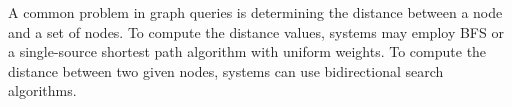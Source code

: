 
A common problem in graph queries is determining the distance between a node and
a set of nodes. To compute the distance values, systems may employ BFS or a
single-source shortest path algorithm with uniform weights. To compute the
distance between two given nodes, systems can use bidirectional search
algorithms.


